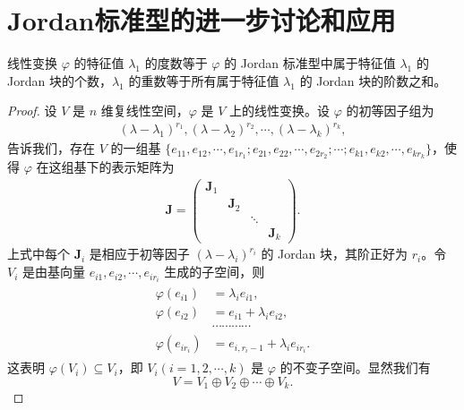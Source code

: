 \documentclass[../../main.tex]{subfiles}
\begin{document}
\section{Jordan标准型的进一步讨论和应用}

\begin{theorem}\label{theorem:关于一个特征值的Jordan块的个数等于其度数,阶数直和等于其重数}
线性变换 $\varphi$ 的特征值 $\lambda_1$ 的度数等于 $\varphi$ 的 Jordan 标准型中属于特征值 $\lambda_1$ 的 Jordan 块的个数，$\lambda_1$ 的重数等于所有属于特征值 $\lambda_1$ 的 Jordan 块的阶数之和。 
\end{theorem}
\begin{proof}
设 $V$ 是 $n$ 维复线性空间，$\varphi$ 是 $V$ 上的线性变换。设 $\varphi$ 的初等因子组为
\begin{align}
(\lambda - \lambda_1)^{r_1}, (\lambda - \lambda_2)^{r_2}, \cdots, (\lambda - \lambda_k)^{r_k}, \label{equation--7.7.1}
\end{align}
告诉我们，存在 $V$ 的一组基 $\{e_{11}, e_{12}, \cdots, e_{1r_1}; e_{21}, e_{22}, \cdots, e_{2r_2}; \cdots; e_{k1}, e_{k2}, \cdots, e_{kr_k}\}$，使得 $\varphi$ 在这组基下的表示矩阵为
\begin{align*}
\boldsymbol{J} = 
\begin{pmatrix}
\boldsymbol{J}_1 & & & \\
 & \boldsymbol{J}_2 & & \\
 & & \ddots & \\
 & & & \boldsymbol{J}_k
\end{pmatrix}.
\end{align*}
上式中每个 $\boldsymbol{J}_i$ 是相应于初等因子 $(\lambda - \lambda_i)^{r_i}$ 的 Jordan 块，其阶正好为 $r_i$。令 $V_i$ 是由基向量 $e_{i1}, e_{i2}, \cdots, e_{ir_i}$ 生成的子空间，则
\begin{gather}\label{equation--7.7.2}
\begin{aligned}
\varphi(e_{i1}) &= \lambda_i e_{i1}, 
 \\
\varphi(e_{i2}) &= e_{i1} + \lambda_i e_{i2},  \\
&\cdots\cdots\cdots\cdots \\
\varphi(e_{ir_i}) &= e_{i,r_i - 1} + \lambda_i e_{ir_i}.
\end{aligned}
\end{gather}
这表明 $\varphi(V_i) \subseteq V_i$，即 $V_i (i = 1, 2, \cdots, k)$ 是 $\varphi$ 的不变子空间。显然我们有
\[
V = V_1 \oplus V_2 \oplus \cdots \oplus V_k.
\]


\end{proof}
\end{document}
